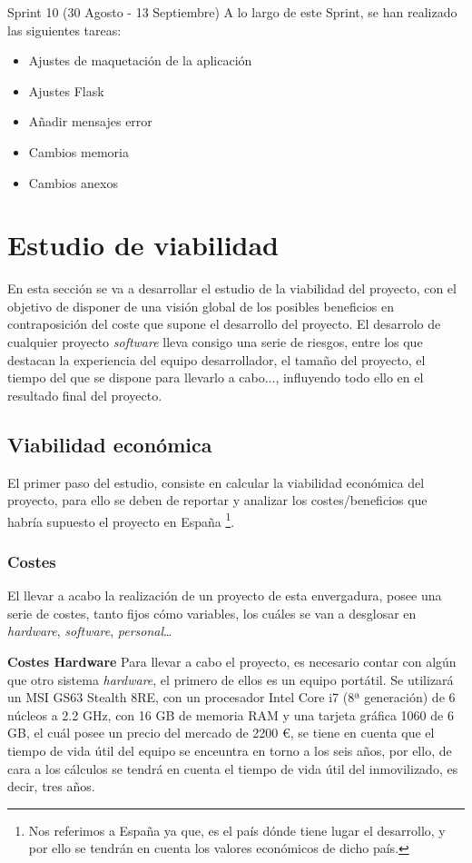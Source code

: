 Sprint 10 (30 Agosto - 13 Septiembre)
A lo largo de este Sprint, se han realizado las siguientes tareas:

\begin{itemize}
    \item Ajustes de maquetación de la aplicación
    \item Ajustes Flask
    \item Añadir mensajes error
    \item Cambios memoria
    \item Cambios anexos
\end{itemize}

\section{Estudio de viabilidad}
En esta sección se va a desarrollar el estudio de la viabilidad del proyecto, con el objetivo de disponer de una visión global de los posibles beneficios en contraposición del coste que supone el desarrollo del proyecto.
El desarrolo de cualquier proyecto \textit{software} lleva consigo una serie de riesgos, entre los que destacan la experiencia del equipo desarrollador, el tamaño del proyecto, el tiempo del que se dispone para llevarlo a cabo..., influyendo todo ello en el resultado final del proyecto.

\subsection{Viabilidad económica}
El primer paso del estudio, consiste en calcular la viabilidad económica del proyecto, para ello se deben de reportar y analizar los costes/beneficios que habría supuesto el proyecto en España \footnote{Nos referimos a España ya que, es el país dónde tiene lugar el desarrollo, y por ello se tendrán en cuenta los valores económicos de dicho país.}.

\subsubsection{Costes}
El llevar a acabo la realización de un proyecto de esta envergadura, posee una serie de costes, tanto fijos cómo variables, los cuáles se van a desglosar en \textit{hardware}, \textit{software}, \textit{personal}\dots

\textbf{Costes Hardware}
Para llevar a cabo el proyecto, es necesario contar con algún que otro sistema \textit{hardware}, el primero de ellos es un equipo portátil. Se utilizará un MSI GS63 Stealth 8RE, con un procesador Intel Core i7 (8ª generación) de 6 núcleos a 2.2 GHz, con 16 GB de memoria RAM y una tarjeta gráfica 1060 de 6 GB, el cuál posee un precio del mercado de 2200 €, se tiene en cuenta que el tiempo de vida útil del equipo se enceuntra en torno a los seis años, 
por ello, de cara a los cálculos se tendrá en cuenta el tiempo de vida útil del inmovilizado, es decir, tres años.

